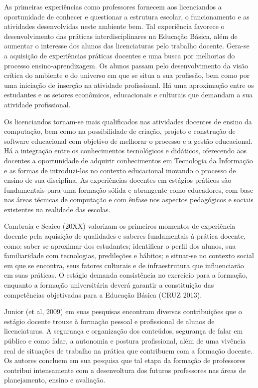     
    As primeiras experiências como professores fornecem aos licenciandos a oportunidade de conhecer e questionar a estrutura escolar, o funcionamento e as atividades desenvolvidas neste ambiente bem. Tal experiência favorece o desenvolvimento das práticas interdisciplinares na Educação Básica, além de aumentar o interesse dos alunos das licenciaturas pelo trabalho docente. Gera-se a aquisição de experiências práticas docentes e uma busca por melhorias do processo ensino-aprendizagem. Os alunos passam pelo desenvolvimento da visão crítica do ambiente e do universo em que se situa a sua profissão, bem como por uma iniciação de inserção na atividade profissional. Há uma aproximação entre os estudantes e os setores econômicos, educacionais e culturais que demandam a sua atividade profissional.
	
    
    Os licenciandos tornam-se mais qualificados nas atividades docentes de ensino da computação, bem como na possibilidade de criação, projeto e construção de software educacional com objetivo de melhorar o processo e a gestão educacional. Há a integração entre os conhecimentos tecnológicos e didáticos, oferecendo aos docentes a oportunidade de adquirir conhecimentos em Tecnologia da Informação e as formas de introduzi-los no contexto educacional inovando o processo de ensino de sua disciplina. As experiências docentes em estágios práticos são fundamentais para uma formação sólida e abrangente como educadores, com base nas áreas técnicas de computação e com ênfase nos aspectos pedagógicos e sociais existentes na realidade das escolas.
	
    
    Cambraia e Scaico (20XX) valorizam os primeiros momentos de experiência docente pela aquisição de qualidades e saberes fundamentais à prática docente, como: saber se  aproximar dos estudantes;  identificar o perfil dos alunos, sua familiaridade com tecnologias, predileções e hábitos; e situar-se no contexto social em que se encontra, seus fatores culturais e de infraestrutura que influenciarão em suas práticas. O estágio demanda consistência no exercício para a formação, enquanto a formação universitária deverá garantir a constituição das competências objetivadas para a Educação Básica (CRUZ 2013).	
	
    
    Junior (et al, 2009) em suas pesquisas encontram diversas contribuições que o estágio docente trouxe à formação pessoal e profissional de alunos de licenciaturas. A segurança e organização dos conteúdos, segurança de falar em público e como falar, a autonomia e postura profissional, além de uma vivência real de situações de trabalho na prática que contribuem com a formação docente. Os autores concluem em sua pesquisa que tal etapa da formação de professores contribui intensamente com a desenvoltura dos futuros professores nas áreas de planejamento, ensino e avaliação. 
	
